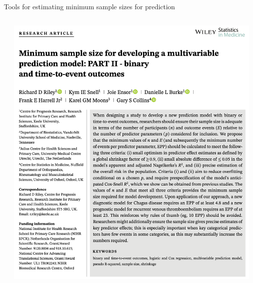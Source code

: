\documentclass[11pt]{beamer}
\begin{document}
\begin{frame}[t]{Tools for estimating minimum sample sizes for prediction}
\begin{columns}
\begin{column}[c]{0.5\textwidth}
		\end{column}
		\begin{column}[c]{0.5\textwidth}
			\includegraphics[width=\textwidth]{figures/riley2.png}

		\end{column}
	\end{columns}

\end{frame}
\end{document}
